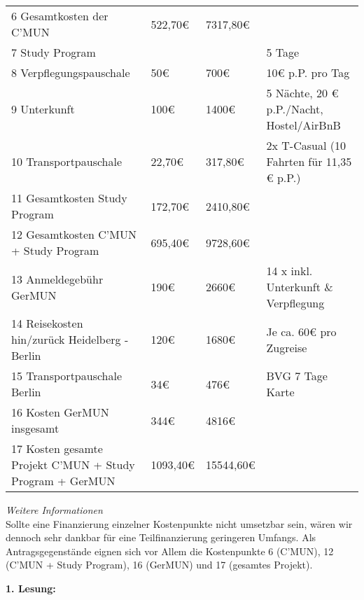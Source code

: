 {\begin{tabular}{p{5cm} p{1.5cm} p{1.5cm} p{7cm}}
        6 Gesamtkosten der C'MUN & 522,70€ & 7317,80€ &\\
        7 Study Program & & & 5 Tage\\
        8 Verpflegungspauschale & 50€ & 700€ & 10€ p.P. pro Tag\\
        9 Unterkunft & 100€ & 1400€ & 5 Nächte, 20 € p.P./Nacht, Hostel/AirBnB\\
        10 Transportpauschale & 22,70€ & 317,80€ & 2x T-Casual (10 Fahrten für 11,35 € p.P.)\\
        11 Gesamtkosten Study Program & 172,70€ & 2410,80€ & \\
        12 Gesamtkosten C'MUN + Study Program & 695,40€ & 9728,60€ &\\
        13 Anmeldegebühr GerMUN & 190€ & 2660€ & 14 x inkl. Unterkunft \& Verpflegung\\
        14 Reisekosten hin/zurück Heidelberg - Berlin & 120€ & 1680€ & Je ca. 60€ pro Zugreise\\
        15 Transportpauschale Berlin & 34€ & 476€ & BVG 7 Tage Karte\\
        16 Kosten GerMUN insgesamt & 344€ & 4816€ &\\
        17 Kosten gesamte Projekt C'MUN + Study Program + GerMUN & 1093,40€ & 15544,60€ &\\
    \end{tabular}
    \emph{Weitere Informationen}\\
    Sollte eine Finanzierung einzelner Kostenpunkte nicht umsetzbar sein, wären wir dennoch sehr dankbar für eine Teilfinanzierung geringeren Umfangs. Als Antragsgegenstände eignen sich vor Allem die Kostenpunkte 6 (C’MUN), 12 (C’MUN + Study Program), 16 (GerMUN) und 17 (gesamtes Projekt).
}{
    \textbf{1. Lesung:}\\
    \ul{
        {}}
}
